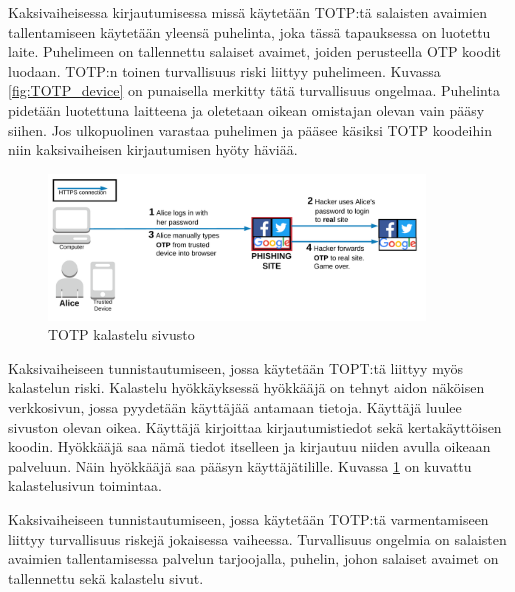 Kaksivaiheisessa kirjautumisessa missä käytetään TOTP:tä salaisten avaimien tallentamiseen käytetään yleensä puhelinta, joka tässä tapauksessa on luotettu laite. Puhelimeen on tallennettu salaiset avaimet, joiden perusteella OTP koodit luodaan. TOTP:n toinen turvallisuus riski liittyy puhelimeen. Kuvassa \ref{fig:TOTP_device} on punaisella merkitty tätä turvallisuus ongelmaa. Puhelinta pidetään luotettuna laitteena ja oletetaan oikean omistajan olevan vain pääsy siihen. Jos ulkopuolinen varastaa puhelimen ja pääsee käsiksi TOTP koodeihin niin kaksivaiheisen kirjautumisen hyöty häviää.

\begin{figure}[ht]
    \centering
    \includegraphics[width=10cm]{template/figures/totp phishing attack.png}
    \caption{TOTP kalastelu sivusto \citep{TOTP}}
    \label{fig:TOTP_phishing}
\end{figure}

Kaksivaiheiseen tunnistautumiseen, jossa käytetään TOPT:tä liittyy myös kalastelun riski. Kalastelu hyökkäyksessä hyökkääjä on tehnyt aidon näköisen verkkosivun, jossa pyydetään käyttäjää antamaan tietoja. Käyttäjä luulee sivuston olevan oikea. Käyttäjä kirjoittaa kirjautumistiedot sekä kertakäyttöisen koodin. Hyökkääjä saa nämä tiedot itselleen ja kirjautuu niiden avulla oikeaan palveluun. Näin hyökkääjä saa pääsyn käyttäjätilille. Kuvassa \ref{fig:TOTP_phishing} on kuvattu kalastelusivun toimintaa. 
 
Kaksivaiheiseen tunnistautumiseen, jossa käytetään TOTP:tä varmentamiseen liittyy turvallisuus riskejä jokaisessa vaiheessa. Turvallisuus ongelmia on salaisten avaimien tallentamisessa palvelun tarjoojalla, puhelin, johon salaiset avaimet on tallennettu sekä kalastelu sivut. 
